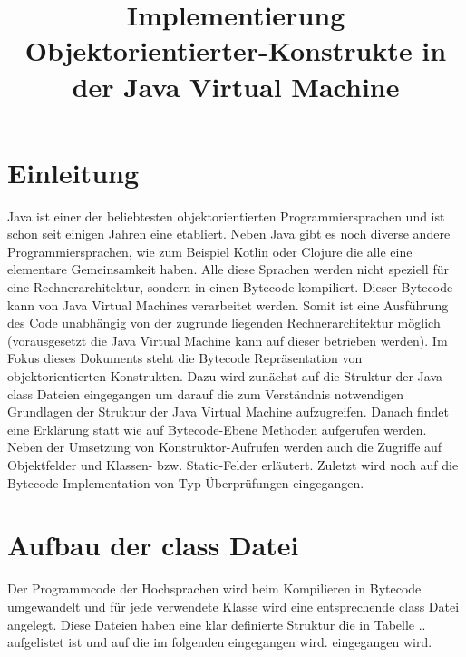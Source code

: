\documentclass[conference]{IEEEtran}
\begin{document}
\title{Implementierung Objektorientierter-Konstrukte in der Java Virtual Machine\\}

\author{
}

\maketitle

\begin{abstract}

\end{abstract}



\section{Einleitung}
Java ist einer der beliebtesten objektorientierten Programmiersprachen und ist schon seit einigen Jahren eine etabliert. Neben Java gibt es noch diverse andere Programmiersprachen, wie zum Beispiel Kotlin oder Clojure die alle eine elementare Gemeinsamkeit haben. Alle diese Sprachen werden nicht speziell für eine Rechnerarchitektur, sondern in einen Bytecode kompiliert. Dieser Bytecode kann von Java Virtual Machines verarbeitet werden. Somit ist eine Ausführung des Code unabhängig von der zugrunde liegenden Rechnerarchitektur möglich (vorausgesetzt die Java Virtual Machine kann auf dieser betrieben werden). Im Fokus dieses Dokuments steht die Bytecode Repräsentation von objektorientierten Konstrukten. Dazu wird zunächst auf die Struktur der Java class Dateien eingegangen um darauf die zum Verständnis notwendigen Grundlagen der Struktur der Java Virtual Machine aufzugreifen. Danach findet eine Erklärung statt wie auf Bytecode-Ebene Methoden aufgerufen werden. Neben der Umsetzung von Konstruktor-Aufrufen werden auch die Zugriffe auf Objektfelder und Klassen- bzw. Static-Felder erläutert. Zuletzt wird noch auf die Bytecode-Implementation von Typ-Überprüfungen eingegangen.  

\section{Aufbau der class Datei}
Der Programmcode der Hochsprachen wird beim Kompilieren in Bytecode umgewandelt und für jede verwendete Klasse wird eine entsprechende class Datei angelegt. Diese Dateien haben eine klar definierte Struktur die in Tabelle .. aufgelistet ist und auf die im folgenden eingegangen wird. eingegangen wird.
\end{document}
